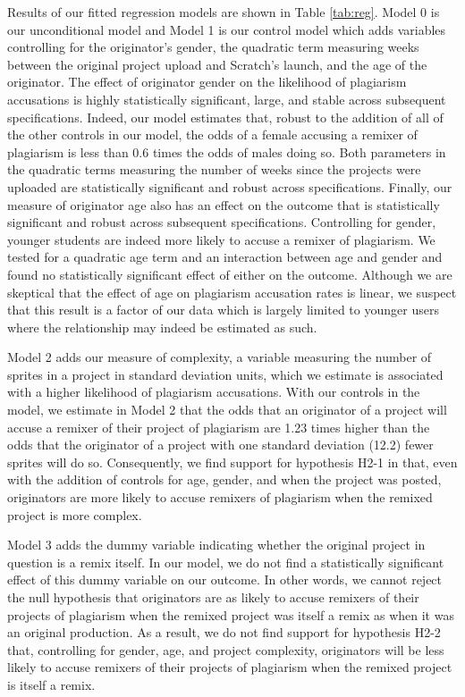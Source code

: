 Results of our fitted regression models are shown in Table
\ref{tab:reg}.  Model 0 is our unconditional model and Model 1 is our
control model which adds variables controlling for the originator's
gender, the quadratic term measuring weeks between the original project
upload and Scratch's launch, and the age of the originator. The effect
of originator gender on the likelihood of plagiarism accusations is
highly statistically significant, large, and stable across subsequent
specifications. Indeed, our model estimates that, robust to the addition
of all of the other controls in our model, the odds of a
female accusing a remixer of plagiarism is less than 0.6 times the odds
of males doing so. Both parameters in the quadratic terms measuring the
number of weeks since the projects were uploaded are statistically
significant and robust across specifications. Finally, our measure of
originator age also has an effect on the outcome that is statistically
significant and robust across subsequent specifications. Controlling for
gender, younger students are indeed more likely to accuse a remixer of
plagiarism. We tested for a quadratic age term and an interaction
between age and gender and found no statistically significant effect of
either on the outcome.  Although we are skeptical that the effect of age
on plagiarism accusation rates is linear, we suspect that this result is
a factor of our data which is largely limited to younger users where the
relationship may indeed be estimated as such.


Model 2 adds our measure of complexity, a variable measuring the number
of sprites in a project in standard deviation units, which we estimate
is associated with a higher likelihood of plagiarism accusations.  With
our controls in the model, we estimate in Model 2 that the odds that an
originator of a project will accuse a remixer of their project of
plagiarism are 1.23 times higher than the odds that the originator of a
project with one standard deviation (12.2) fewer sprites will do so.
Consequently, we find support for hypothesis H2-1 in that, even with the
addition of controls for age, gender, and when the project was posted,
originators are more likely to accuse remixers of plagiarism when the
remixed project is more complex.

Model 3 adds the dummy variable indicating whether the original project
in question is a remix itself. In our model, we do not find a
statistically significant effect of this dummy variable on our outcome.
In other words, we cannot reject the null hypothesis that originators
are as likely to accuse remixers of their projects of plagiarism when
the remixed project was itself a remix as when it was an original
production. As a result, we do not find support for hypothesis H2-2
that, controlling for gender, age, and project complexity, originators
will be less likely to accuse remixers of their projects of plagiarism
when the remixed project is itself a remix.


